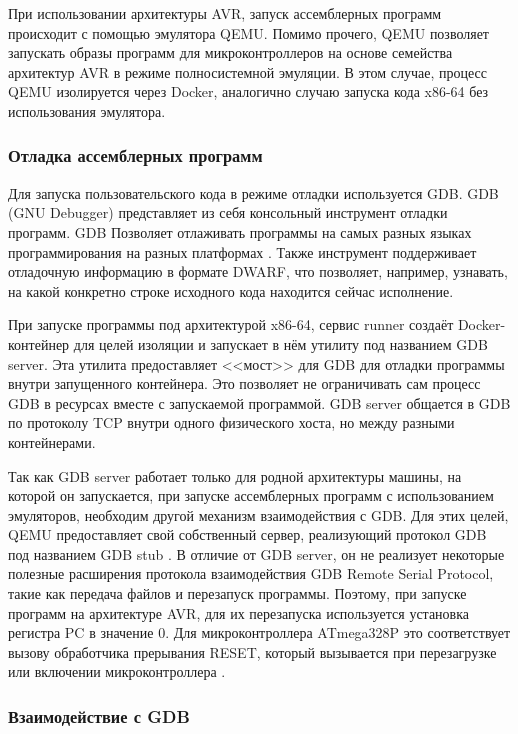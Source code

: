 \documentclass[a4paper,article,14pt]{extarticle}
\begin{document}
При использовании архитектуры AVR, запуск ассемблерных программ происходит с помощью эмулятора QEMU. Помимо прочего, QEMU позволяет запускать образы программ для микроконтроллеров на основе семейства архитектур AVR в режиме полносистемной эмуляции. В этом случае, процесс QEMU изолируется через Docker, аналогично случаю запуска кода x86-64 без использования эмулятора.

\subsubsection{Отладка ассемблерных программ}

Для запуска пользовательского кода в режиме отладки используется GDB. GDB (GNU Debugger) представляет из себя консольный инструмент отладки программ. GDB Позволяет отлаживать программы на самых разных языках программирования на разных платформах \cite{gdb}. Также инструмент поддерживает отладочную информацию в формате DWARF, что позволяет, например, узнавать, на какой конкретно строке исходного кода находится сейчас исполнение.

При запуске программы под архитектурой x86-64, сервис runner создаёт Docker-контейнер для целей изоляции и запускает в нём утилиту под названием GDB server. Эта утилита предоставляет <<мост>> для GDB для отладки программы внутри запущенного контейнера. Это позволяет не ограничивать сам процесс GDB в ресурсах вместе с запускаемой программой. GDB server общается в GDB по протоколу TCP внутри одного физического хоста, но между разными контейнерами.

Так как GDB server работает только для родной архитектуры машины, на которой он запускается, при запуске ассемблерных программ с использованием эмуляторов, необходим другой механизм взаимодействия с GDB. Для этих целей, QEMU предоставляет свой собственный сервер, реализующий протокол GDB под названием GDB stub \cite{gdbstub}. В отличие от GDB server, он не реализует некоторые полезные расширения протокола взаимодействия GDB Remote Serial Protocol, такие как передача файлов и перезапуск программы. Поэтому, при запуске программ на архитектуре AVR, для их перезапуска используется установка регистра PC в значение 0. Для микроконтроллера ATmega328P это соответствует вызову обработчика прерывания RESET, который вызывается при перезагрузке или включении микроконтроллера \cite{atmega328p}.

\subsubsection{Взаимодействие с GDB}
\end{document}
